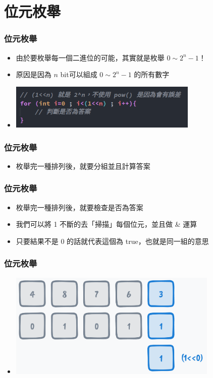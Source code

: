 \documentclass{beamer}
\begin{document}
\section{位元枚舉}

\begin{frame}
    \frametitle{位元枚舉}
    \begin{itemize}
        \item 由於要枚舉每一個二進位的可能，其實就是枚舉 $0 \sim 2^n-1$！
        \item 原因是因為 $n$ bit可以組成 $0 \sim 2^n-1$ 的所有數字
        \vspace{0.5cm}
        \item \includegraphics[width=9.0cm]{img/img_4}
    \end{itemize}
\end{frame}

\begin{frame}
    \frametitle{位元枚舉}
    \begin{itemize}
        \item 枚舉完一種排列後，就要分組並且計算答案
    \end{itemize}
\end{frame}

\begin{frame}
    \frametitle{位元枚舉}
    \begin{itemize}
        \item 枚舉完一種排列後，就要檢查是否為答案
        \item 我們可以將 1 不斷的去「掃描」每個位元，並且做 \& 運算
        \item 只要結果不是 0 的話就代表這個為 true，也就是同一組的意思
    \end{itemize}
\end{frame}

\begin{frame}
    \frametitle{位元枚舉}
    \begin{itemize}
        \item \includegraphics[width=10.0cm]{img/img_5.png}
    \end{itemize}
\end{frame}
\end{document}
